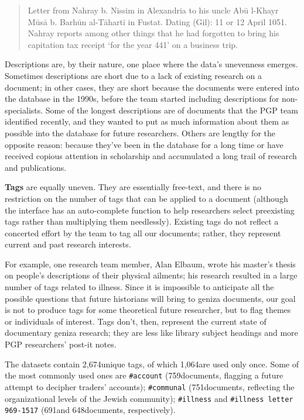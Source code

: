 \documentclass{article}
\def\uniqueTags{2,674}
\def\taggedAccount{759}
\def\taggedCommunal{751}
\def\taggedIllness{691}
\def\taggedIllnessLetter{648}
\def\singletonTags{1,064}
\begin{document}
\begin{quote}
Letter from Nahray b. Nissim in Alexandria to his uncle Abū l-Khayr Mūsā b. Barhūn al-Tāhartī in Fustat. Dating (Gil): 11 or 12 April 1051. Nahray reports among other things that he had forgotten to bring his capitation tax receipt ‘for the year 441’ on a business trip. \autocite{noauthor_letter_1050}
\end{quote}
Descriptions are, by their nature, one place where the data’s unevenness emerges. Sometimes descriptions are short due to a lack of existing research on a document; in other cases, they are short because the documents were entered into the database in the 1990s, before the team started including descriptions for non-specialists. Some of the longest descriptions are of documents that the PGP team identified recently, and they wanted to put as much information about them as possible into the database for future researchers. Others are lengthy for the opposite reason: because they’ve been in the database for a long time or have received copious attention in scholarship and accumulated a long trail of research and publications. 

\textbf{Tags} are equally uneven. They are essentially free-text, and there is no restriction on the number of tags that can be applied to a document (although the interface has an auto-complete function to help researchers select preexisting tags rather than multiplying them needlessly). Existing tags do not reflect a concerted effort by the team to tag all our documents; rather, they represent current and past research interests. 

For example, one research team member, Alan Elbaum, wrote his master’s thesis on people’s descriptions of their physical ailments; his research resulted in a large number of tags related to illness. Since it is impossible to anticipate all the possible questions that future historians will bring to geniza documents, our goal is not to produce tags for some theoretical future researcher, but to flag themes or individuals of interest. Tags don’t, then, represent the current state of documentary geniza research; they are less like library subject headings and more PGP researchers’ post-it notes.

The datasets contain \uniqueTags\space unique tags, of which \singletonTags\space are used only once. Some of the most commonly used ones are \texttt{\#account} (\taggedAccount\space documents, flagging a future attempt to decipher traders’ accounts); \texttt{\#communal} (\taggedCommunal\space documents, reflecting the organizational levels of the Jewish community); \texttt{\#illness} and \texttt{\#illness letter 969-1517}  (\taggedIllness\space and \taggedIllnessLetter\space documents, respectively). 
\end{document}

